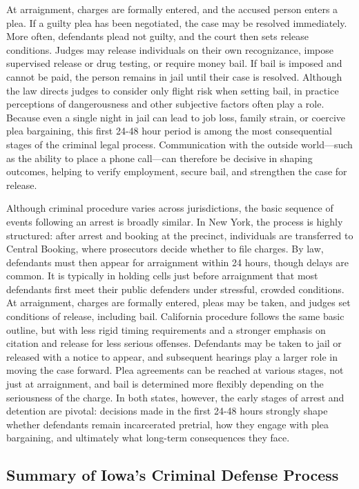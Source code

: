 \documentclass[12pt, a4paper]{article}
\begin{document}
At arraignment, charges are formally entered, and the accused person enters a plea. If a guilty plea has been negotiated, the case may be resolved immediately. More often, defendants plead not guilty, and the court then sets release conditions. Judges may release individuals on their own recognizance, impose supervised release or drug testing, or require money bail. If bail is imposed and cannot be paid, the person remains in jail until their case is resolved. Although the law directs judges to consider only flight risk when setting bail, in practice perceptions of dangerousness and other subjective factors often play a role. Because even a single night in jail can lead to job loss, family strain, or coercive plea bargaining, this first 24-48 hour period is among the most consequential stages of the criminal legal process. Communication with the outside world—such as the ability to place a phone call—can therefore be decisive in shaping outcomes, helping to verify employment, secure bail, and strengthen the case for release.

Although criminal procedure varies across jurisdictions, the basic sequence of events following an arrest is broadly similar. In New York, the process is highly structured: after arrest and booking at the precinct, individuals are transferred to Central Booking, where prosecutors decide whether to file charges. By law, defendants must then appear for arraignment within 24 hours, though delays are common. It is typically in holding cells just before arraignment that most defendants first meet their public defenders under stressful, crowded conditions. At arraignment, charges are formally entered, pleas may be taken, and judges set conditions of release, including bail. California procedure follows the same basic outline, but with less rigid timing requirements and a stronger emphasis on citation and release for less serious offenses. Defendants may be taken to jail or released with a notice to appear, and subsequent hearings play a larger role in moving the case forward. Plea agreements can be reached at various stages, not just at arraignment, and bail is determined more flexibly depending on the seriousness of the charge. In both states, however, the early stages of arrest and detention are pivotal: decisions made in the first 24-48 hours strongly shape whether defendants remain incarcerated pretrial, how they engage with plea bargaining, and ultimately what long-term consequences they face.

\subsection*{Summary of Iowa's Criminal Defense Process}
\end{document}
